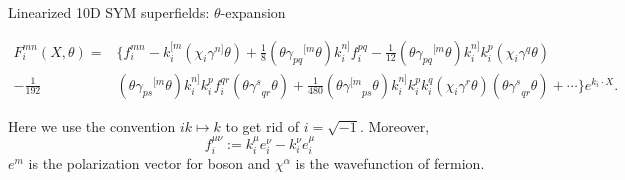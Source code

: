 \documentclass{beamer}
\begin{document}
\begin{frame}[allowframebreaks]{Linearized 10D SYM superfields: $\theta$-expansion}
\begin{footnotesize}
\begin{equation*}
\begin{aligned}
			F^{mn}_i(X,\theta) = &
			\Biggl\{
			f_i^{mn}
			- k_i^{[m} (\chi_i \gamma^{n]} \theta)
			+ \frac{1}{8} (\theta \gamma_{pq}{}^{[m}\theta) k_i^{n]} f_i^{pq}
			- \frac{1}{12} (\theta \gamma_{pq}{}^{[m}\theta) k_i^{n]} k_i^p (\chi_i \gamma^q \theta) \\
			-\frac{1}{192}&(\theta{\gamma_{ps}}^{[m}\theta)k_i^{n]}k_i^pf_i^{qr}(\theta{\gamma^s}_{qr}\theta)+\frac{1}{480}(\theta{\gamma^{[m}}_{ps}\theta)k_i^{n]}k_i^pk_i^q(\chi_i\gamma^r\theta)(\theta{\gamma^s}_{qr}\theta)
			+ \cdots
			\Biggr\} e^{k_i \cdot X}.
		\end{aligned}
	\end{equation*}
	\end{footnotesize}
	Here we use the convention $ik \mapsto k$ to get rid of $i=\sqrt{-1}$. Moreover,
	\begin{equation*}
		f_i^{\mu\nu}:=k_i^\mu e_i^\nu-k_i^\nu e_i^\mu
	\end{equation*}
	$e^m$ is the polarization vector for boson and $\chi^\alpha$ is the wavefunction of fermion.
\end{frame}
\end{document}
